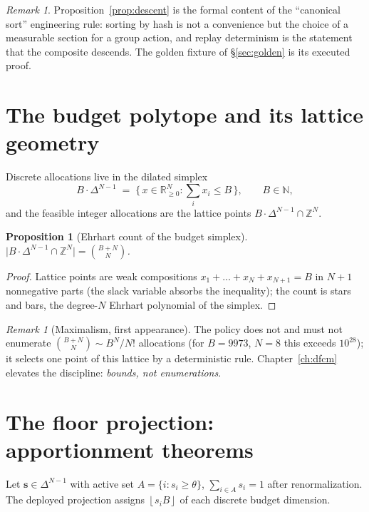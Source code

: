\documentclass[12pt,oneside]{report}
\theoremstyle{plain}
\newtheorem{proposition}[theorem]{Proposition}
\theoremstyle{definition}
\theoremstyle{remark}
\newtheorem{remarkx}[theorem]{Remark}
\newcommand{\R}{\mathbb{R}}
\newcommand{\Z}{\mathbb{Z}}
\newcommand{\N}{\mathbb{N}}
\newcommand{\floor}[1]{\left\lfloor #1\right\rfloor}
\newcommand{\simplex}{\Delta}
\newcommand{\shares}{\mathbf{s}}
\begin{document}
\begin{remarkx}
Proposition~\ref{prop:descent} is the formal content of the
``canonical sort'' engineering rule: sorting by hash is not a
convenience but the choice of a measurable section for a group action,
and replay determinism is the statement that the composite descends.
The golden fixture of \S\ref{sec:golden} is its executed proof.
\end{remarkx}

\section{The budget polytope and its lattice geometry}

Discrete allocations live in the dilated simplex
\begin{equation}
B\!\cdot\!\simplex^{N-1} \;=\; \bigl\{\, x\in\R_{\ge0}^N : \textstyle\sum_i
x_i \le B \,\bigr\}, \qquad B\in\N,
\end{equation}
and the feasible integer allocations are the lattice points
$B\!\cdot\!\simplex^{N-1}\cap\Z^N$.

\begin{proposition}[Ehrhart count of the budget simplex]
\label{prop:ehrhart}
$\bigl|B\!\cdot\!\simplex^{N-1}\cap\Z^N\bigr| = \binom{B+N}{N}$.
\end{proposition}

\begin{proof}
Lattice points are weak compositions $x_1+\dots+x_N+x_{N+1}=B$ in $N+1$
nonnegative parts (the slack variable absorbs the inequality); the count
is stars and bars, the degree-$N$ Ehrhart polynomial of the simplex.
\end{proof}

\begin{remarkx}[Maximalism, first appearance]
The policy does not and must not enumerate
$\binom{B+N}{N}\sim B^N/N!$ allocations (for $B=9973$, $N=8$ this
exceeds $10^{28}$); it selects one point of this lattice by a
deterministic rule. Chapter~\ref{ch:dfcm} elevates the discipline:
\emph{bounds, not enumerations}.
\end{remarkx}

\section{The floor projection: apportionment theorems}

Let $\shares\in\simplex^{N-1}$ with active set
$A=\{i: s_i\ge\theta\}$, $\sum_{i\in A}s_i=1$ after renormalization.
The deployed projection assigns $\floor{s_i B}$ of each discrete
budget dimension.
\end{document}
